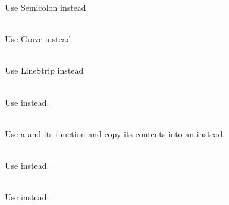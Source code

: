 \begin{DoxyRefList}
\label{deprecated__deprecated000023}%
%
Use Semicolon instead  
\item[Member \doxylink{classsf_1_1_keyboard_acb4cacd7cc5802dec45724cf3314a142a90be0882086bccb516e3afc5c7fb82eb}{sf\+::Keyboard\+::Tilde} ]\hfill \\
\label{deprecated__deprecated000019}%
%
Use Grave instead  
\item[Member \doxylink{group__graphics_gga5ee56ac1339984909610713096283b1ba5b09910f5d0f39641342184ccd0d1de3}{sf\+::Lines\+Strip} ]\hfill \\
\label{deprecated__deprecated000001}%
%
Use Line\+Strip instead  
\item[Member \doxylink{classsf_1_1_render_texture_aaec1fb8ee77844da50b0143cb41c8a71}{sf\+::Render\+Texture\+::create} (unsigned int width, unsigned int height, bool depth\+Buffer)]\hfill \\
\label{deprecated__deprecated000004}%
%
Use  instead. 
\item[Member \doxylink{classsf_1_1_render_window_a370137abe81f6b7d62b600ceeccd54d3}{sf\+::Render\+Window\+::capture} () const]\hfill \\
\label{deprecated__deprecated000005}%
%
 Use a  and its  function and copy its contents into an  instead.  
\item[Member \doxylink{classsf_1_1_shader_a4d6ec78f6de1a0a2146c93ab09d7d762}{sf\+::Shader\+::set\+Parameter} (const std\+::string \&name, float x)]\hfill \\
\label{deprecated__deprecated000006}%
%
Use  instead. 
\item[Member \doxylink{classsf_1_1_shader_a61f5cdb5847fc3b57335b095a2f3dad3}{sf\+::Shader\+::set\+Parameter} (const std\+::string \&name, float x, float y)]\hfill \\
\label{deprecated__deprecated000007}%
%
Use  instead. 

\end{DoxyRefList}

